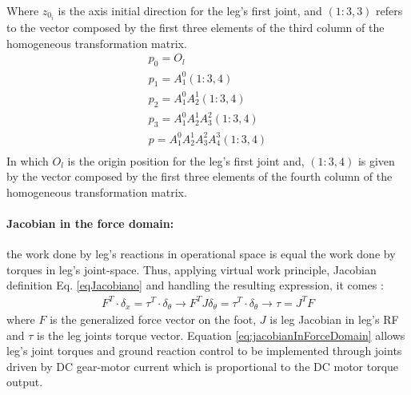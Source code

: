 Where $z_{0_i}$ is the axis initial direction for the leg's first joint, and $(1:3,3)$ refers to the vector composed by the first three elements of the third column of the homogeneous transformation matrix.
\begin{equation} 
\label{eq:04}
\begin{array} {l}
p_0 = O_l\\
p_1=A_1^0 (1:3,4)\\
p_2=A_1^0 A_2^1  (1:3,4)\\
p_3=A_1^0 A_2^1 A_3^2 (1:3,4)\\
p=A_1^0 A_2^1 A_3^2 A_4^3 (1:3,4)\\
\end{array}
\end{equation}
In which $O_l$ is the origin position for the leg's first joint and, $(1:3,4)$ is given by the vector composed by the first three elements of the fourth column of the homogeneous transformation matrix.\\
\paragraph{Jacobian in the force domain:} the work done by leg's reactions in operational space is equal the work done by torques in leg's joint-space. Thus, applying virtual work principle, Jacobian definition Eq. \ref{eqJacobiano} and handling the resulting expression, it comes \cite{craig_introduction_1989}:
\begin{eqnarray}
\label{eq:jacobianInForceDomain}
	F^T\cdot\delta_x=\tau^T\cdot\delta_{\theta}\rightarrow
	F^TJ\delta_{\theta}=\tau^T\cdot\delta_{\theta}\rightarrow\tau=J^TF
\end{eqnarray}
where $F$  is the generalized force vector on the foot, $J$ is leg Jacobian in leg's RF and $\tau$ is the leg joints torque vector. Equation \ref{eq:jacobianInForceDomain} allows leg's joint torques and ground reaction control to be implemented through joints driven by DC gear-motor current which is proportional to the DC motor torque output. 
